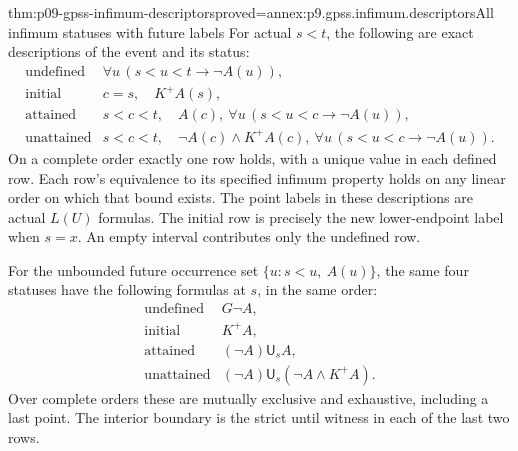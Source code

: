 \begin{hblemma}{thm:p09-gpss-infimum-descriptors}{proved=annex:p9.gpss.infimum.descriptors}{All infimum statuses with future labels}
For actual \(s<t\), the following are exact descriptions of the
event and its status:
\[
\begin{array}{c|l}
 \mathrm{undefined}&\forall u\,(s<u<t\to\neg A(u)),\\
 \mathrm{initial}&c=s,\quad K^+A(s),\\
 \mathrm{attained}&s<c<t,\quad A(c),\
                    \forall u\,(s<u<c\to\neg A(u)),\\
 \mathrm{unattained}&s<c<t,\quad\neg A(c)\land K^+A(c),\
                    \forall u\,(s<u<c\to\neg A(u)).
\end{array}
\]
On a complete order exactly one row holds, with a unique value in
each defined row. Each row's equivalence to its specified infimum
property holds on any linear order on which that bound exists.
The point labels in these descriptions are actual \(L(U)\) formulas.
The initial row is precisely the new lower-endpoint label when \(s=x\).
An empty interval contributes only the undefined row.

For the unbounded future occurrence set \(\{u:s<u,\ A(u)\}\),
the same four statuses have the following formulas at \(s\),
in the same order:
\[
\begin{array}{c|l}
 \mathrm{undefined}&G\neg A,\\
 \mathrm{initial}&K^+A,\\
 \mathrm{attained}&(\neg A)\mathbin{\mathsf U_s}A,\\
 \mathrm{unattained}&(\neg A)\mathbin{\mathsf U_s}
                                      (\neg A\land K^+A).
\end{array}
\]
Over complete orders these are mutually exclusive and exhaustive,
including a last point. The interior boundary is the strict until
witness in each of the last two rows.
\end{hblemma}

